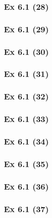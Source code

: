 \subsubsection{Ex 6.1 (28)}\label{sec:Ex_6.1.28}

\subsubsection{Ex 6.1 (29)}\label{sec:Ex_6.1.29}

\subsubsection{Ex 6.1 (30)}\label{sec:Ex_6.1.30}

\newpage		%

\subsubsection{Ex 6.1 (31)}\label{sec:Ex_6.1.31}

\subsubsection{Ex 6.1 (32)}\label{sec:Ex_6.1.32}

\subsubsection{Ex 6.1 (33)}\label{sec:Ex_6.1.33}

\subsubsection{Ex 6.1 (34)}\label{sec:Ex_6.1.34}

\subsubsection{Ex 6.1 (35)}\label{sec:Ex_6.1.35}

\subsubsection{Ex 6.1 (36)}\label{sec:Ex_6.1.36}

\subsubsection{Ex 6.1 (37)}\label{sec:Ex_6.1.37}

